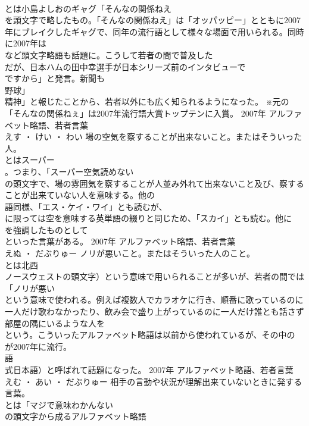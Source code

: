 \documentclass[8pt]{extreport}
\begin{document}
\begin{CJK}{UTF8}{min}
\\	とは小島よしおのギャグ「そんなの関係ねえ
\\	を頭文字で略したもの。「そんなの関係ねえ」は「オッパッピー」とともに2007年にブレイクしたギャグで、同年の流行語として様々な場面で用いられる。同時に2007年は
\\	など頭文字略語も話題に。こうして若者の間で普及した
\\	だが、日本ハムの田中幸選手が日本シリーズ前のインタビューで
\\	ですから」と発言。新聞も
\\	野球」
\\	精神」と報じたことから、若者以外にも広く知られるようになった。 ※元の「そんなの関係ねぇ」は2007年流行語大賞トップテンに入賞。	2007年	アルファベット略語、若者言葉	
\\	えす ・ けい ・ わい	場の空気を察することが出来ないこと。またはそういった人。	
\\	とはスーパー
\\	。つまり、「スーパー空気読めない
\\	の頭文字で、場の雰囲気を察することが人並み外れて出来ないこと及び、察することが出来ていない人を意味する。他の
\\	語同様、「エス・ケイ・ワイ」とも読むが、
\\	に限っては空を意味する英単語の綴りと同じため、「スカイ」とも読む。他に
\\	を強調したものとして
\\	といった言葉がある。	2007年	アルファベット略語、若者言葉	
\\	えぬ ・ だぶりゅー	ノリが悪いこと。またはそういった人のこと。	
\\	とは北西
\\	ノースウェストの頭文字）という意味で用いられることが多いが、若者の間では「ノリが悪い
\\	という意味で使われる。例えば複数人でカラオケに行き、順番に歌っているのに一人だけ歌わなかったり、飲み会で盛り上がっているのに一人だけ誰とも話さず部屋の隅にいるような人を
\\	という。こういったアルファベット略語は以前から使われているが、その中の
\\	が2007年に流行。
\\	語
\\	式日本語）と呼ばれて話題になった。	2007年	アルファベット略語、若者言葉	
\\	えむ ・ あい ・ だぶりゅー	相手の言動や状況が理解出来ていないときに発する言葉。	
\\	とは「マジで意味わかんない
\\	の頭文字から成るアルファベット略語

\end{CJK}
\end{document}
